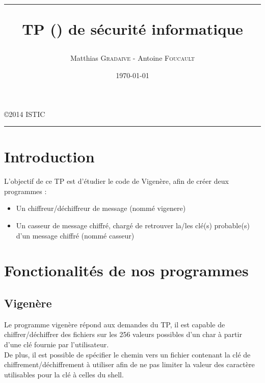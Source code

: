 \documentclass[a4paper, 11pt, oneside]{article}
\title{\hrule \vspace{1cm} TP (\no1) de sécurité informatique}
\author{Matthias \textsc{Gradaive} - Antoine \textsc{Foucault}}
\date{\today}
\begin{document}
\pagestyle{fancy}
\lhead{}
\chead{}
\rhead{\leftmark}
\cfoot{}

\clearpage
\thispagestyle{empty}

\maketitle
\begin{center}
 \copyright 2014 ISTIC\\
\end{center}
\vspace{1cm}
\hrule
\thispagestyle{empty}

\newpage

\renewcommand{\contentsname}{Sommaire}
\tableofcontents
\thispagestyle{empty}
\newpage
\setcounter{page}{1}

\section*{Introduction}

L'objectif de ce TP est d'étudier le code de Vigenère, afin de créer deux programmes :\\

\begin{itemize}
 \item Un chiffreur/déchiffreur de message (nommé vigenere)
 \item Un casseur de message chiffré, chargé de retrouver la/les clé(s) probable(s) d'un message chiffré (nommé casseur)
\end{itemize}

\section{Fonctionalités de nos programmes}

\subsection{Vigenère}

Le programme vigenère répond aux demandes du TP, il est capable de chiffrer/déchiffrer des fichiers sur les 256 valeurs possibles d'un char à partir d'une clé fournie par l'utilisateur.\\
De plus, il est possible de spécifier le chemin vers un fichier contenant la clé de chiffrement/déchiffrement à utiliser afin de ne pas limiter la valeur des caractère utilisables pour la clé à celles du shell.
\end{document}
